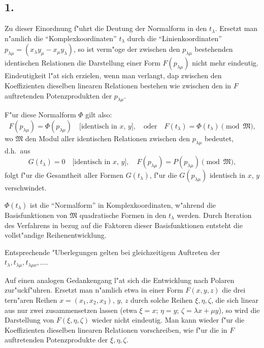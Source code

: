 \documentclass[12pt,a4paper]{article}
\begin{document}
\subsection*{1.}

Zu dieser Einordnung f"uhrt die Deutung der Normalform in den $t_\lambda$. Ersetzt man n"amlich die ``Komplexkoordinaten'' $t_\lambda$ durch die ``Linienkoordinaten'' $p_{\lambda\mu} = (x_\lambda y_\mu - x_\mu y_\lambda)$, so ist verm"oge der zwischen den $p_{\lambda\mu}$ bestehenden identischen Relationen die Darstellung einer Form $F(p_{\lambda\mu})$ nicht mehr eindeutig. Eindeutigkeit l"at sich erzielen, wenn man verlangt, dap zwischen den Koeffizienten dieselben linearen Relationen bestehen wie zwischen den in $F$ auftretenden Potenzprodukten der $p_{\lambda\mu}$.

F"ur diese Normalform $\Phi$ gilt also:
\begin{equation}
F(p_{\lambda\mu}) = \Phi(p_{\lambda\mu}) \quad \text{[identisch in $x$, $y$]}, \quad \text{oder} \quad F(t_\lambda) = \Phi(t_\lambda) \pmod{\mathfrak{M}},
\end{equation}
wo $\mathfrak{M}$ den Modul aller identischen Relationen zwischen den $p_{\lambda\mu}$ bedeutet, d.h.\ aus
\[
G(t_\lambda) = 0 \quad \text{[identisch in $x$, $y$]}, \quad F(p_{\lambda\mu}) = P(p_{\lambda\mu}) \pmod{\mathfrak{M}},
\]
folgt f"ur die Gesamtheit aller Formen $G(t_\lambda)$, f"ur die $G(p_{\lambda\mu})$ identisch in $x$, $y$ verschwindet.

$\Phi(t_\lambda)$ ist die ``Normalform'' in Komplexkoordinaten, w"ahrend die Basisfunktionen von $\mathfrak{M}$ quadratische Formen in den $t_\lambda$ werden. Durch Iteration des Verfahrens in bezug auf die Faktoren dieser Basisfunktionen entsteht die vollst"andige Reihenentwicklung.

Entsprechende "Uberlegungen gelten bei gleichzeitigem Auftreten der $t_\lambda, t_{\lambda\mu}, t_{\lambda\mu\nu}, \ldots$.

Auf einen analogen Gedankengang l"at sich die Entwicklung nach Polaren zur"uckf"uhren. Ersetzt man n"amlich etwa in einer Form $F(x,y,z)$ die drei tern"aren Reihen $x=(x_1,x_2,x_3)$, $y$, $z$ durch solche Reihen $\xi, \eta, \zeta$, die sich linear aus nur zwei zusammensetzen lassen (etwa $\xi=x$; $\eta=y$; $\zeta=\lambda x + \mu y$), so wird die Darstellung von $F(\xi,\eta,\zeta)$ wieder nicht eindeutig. Man kann wieder f"ur die Koeffizienten dieselben linearen Relationen vorschreiben, wie f"ur die in $F$ auftretenden Potenzprodukte der $\xi,\eta,\zeta$.
\end{document}
